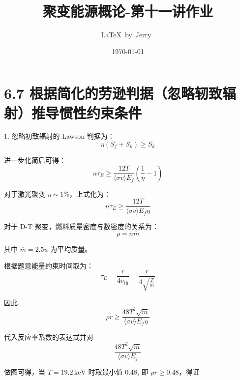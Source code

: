 \documentclass{article}
\title{聚变能源概论-第十一讲作业}
\author{\LaTeX\ by\ Jerry\ }
\date{\today}
\begin{document}
\pagestyle{fancy}

\fancyhead[R]{\today}

\section*{6.7 根据简化的劳逊判据（忽略轫致辐射）推导惯性约束条件}

1. 忽略初致辐射的 Lawson 判据为：$$\eta \left(S_f + S_k \right) \geq S_k$$

进一步化简后可得：$$n \tau_E \geq \frac{12T}{\langle \sigma v \rangle E_f} \left( \frac{1}{\eta} - 1 \right)$$

对于激光聚变 $\eta \sim 1\%$，上式化为：$$n \tau_E \geq \frac{12T}{\langle \sigma v \rangle E_f \eta}$$

对于 D-T 聚变，燃料质量密度与数密度的关系为：$$\rho = n \overline{m}$$

其中 $\overline{m} = 2.5u$ 为平均质量。

根据题意能量约束时间取为：$$\tau_E = \frac{r}{4v_\text{th}} = \frac{r}{4 \sqrt{\frac{T}{m}}}$$

因此$$\rho r \geq \frac{48T^{2} \sqrt{\overline{m}}}{\langle \sigma v \rangle E_f \eta}$$

代入反应率系数的表达式并对 $$\frac{48T^2 \sqrt{\overline{m}}}{\langle \sigma v \rangle E_f}$$

做图可得，当 $ T = 19.2 \, \text{keV} $ 时取最小值 $ 0.48 $, 即 $\rho r \geq 0.48$，得证
\end{document}
